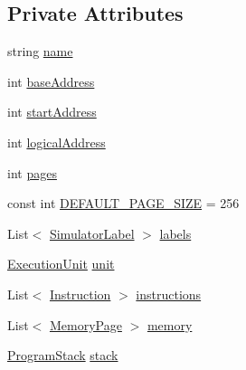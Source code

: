 \subsection*{Private Attributes}
\begin{DoxyCompactItemize}
\item 
string \hyperlink{class_c_p_u___o_s___simulator_1_1_c_p_u_1_1_simulator_program_ad4797b5d81ceb01cd4207a97b7af36c5}{name}
\item 
int \hyperlink{class_c_p_u___o_s___simulator_1_1_c_p_u_1_1_simulator_program_a7cca2ee3950e37d25f4f68d76d1241c4}{base\+Address}
\item 
int \hyperlink{class_c_p_u___o_s___simulator_1_1_c_p_u_1_1_simulator_program_a4c9c4638141ac68fc7f2fed83c53d3f5}{start\+Address}
\item 
int \hyperlink{class_c_p_u___o_s___simulator_1_1_c_p_u_1_1_simulator_program_a4d5ae08fcd223ce00d95588b8761d09c}{logical\+Address}
\item 
int \hyperlink{class_c_p_u___o_s___simulator_1_1_c_p_u_1_1_simulator_program_ad86f4c2caa37cf36b8ab276ebe2a39bb}{pages}
\item 
const int \hyperlink{class_c_p_u___o_s___simulator_1_1_c_p_u_1_1_simulator_program_ad43b4a6e2b20d2097ef7ba885dfa4249}{D\+E\+F\+A\+U\+L\+T\+\_\+\+P\+A\+G\+E\+\_\+\+S\+I\+Z\+E} = 256
\item 
List$<$ \hyperlink{class_c_p_u___o_s___simulator_1_1_c_p_u_1_1_simulator_label}{Simulator\+Label} $>$ \hyperlink{class_c_p_u___o_s___simulator_1_1_c_p_u_1_1_simulator_program_a874cf20890be3725542e9bc032e75c83}{labels}
\item 
\hyperlink{class_c_p_u___o_s___simulator_1_1_c_p_u_1_1_execution_unit}{Execution\+Unit} \hyperlink{class_c_p_u___o_s___simulator_1_1_c_p_u_1_1_simulator_program_a10e4c29c3ed9b84c0fb8aee7613cabf9}{unit}
\item 
List$<$ \hyperlink{class_c_p_u___o_s___simulator_1_1_c_p_u_1_1_instruction}{Instruction} $>$ \hyperlink{class_c_p_u___o_s___simulator_1_1_c_p_u_1_1_simulator_program_a30b501e0b2d012212077059be49857cf}{instructions}
\item 
List$<$ \hyperlink{class_c_p_u___o_s___simulator_1_1_memory_1_1_memory_page}{Memory\+Page} $>$ \hyperlink{class_c_p_u___o_s___simulator_1_1_c_p_u_1_1_simulator_program_a402e53ae5daf1b6be0d5b7b705091c9c}{memory}
\item 
\hyperlink{class_c_p_u___o_s___simulator_1_1_c_p_u_1_1_program_stack}{Program\+Stack} \hyperlink{class_c_p_u___o_s___simulator_1_1_c_p_u_1_1_simulator_program_a85f44af349486db4b141b3946bf21a64}{stack}
\end{DoxyCompactItemize}



